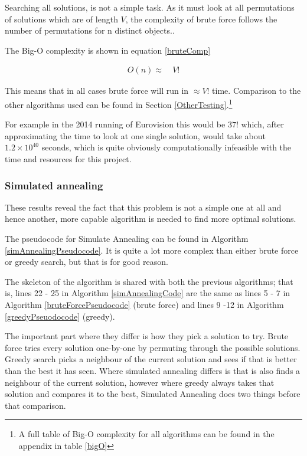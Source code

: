 \documentclass[12pt]{report}
\begin{document}
Searching all solutions, is not a simple task. As it must look at all permutations of solutions which are of length $V$, the complexity of brute force follows the number of permutations for n distinct objects.\cite{Permutation}.

The Big-O complexity is shown in equation \ref{bruteComp}

\begin{equation}\label{bruteComp}
\begin{aligned}
	O(n) \approx{} & \ V!
\end{aligned}
\end{equation}

This means that in all cases brute force will run in $\approx V!$ time. Comparison to the other algorithms used can be found in Section \ref{OtherTesting}.\footnote{A full table of Big-O complexity for all algorithms can be found in the appendix in table \ref{bigO}}

For example in the 2014 running of Eurovision this would be $37!$ which, after approximating the time to look at one single solution, would take about $1.2\times10^{40}$ seconds, which is quite obviously computationally infeasible with the time and resources for this project.

\subsubsection{Simulated annealing}
These results reveal the fact that this problem is not a simple one at all and hence another, more capable algorithm is needed to find more optimal solutions. 

The pseudocode for Simulate Annealing can be found in Algorithm \ref{simAnnealingPseudocode}. It is quite a lot more complex than either brute force or greedy search, but that is for good reason.

The skeleton of the algorithm is shared with both the previous algorithms; that is, lines 22 - 25 in Algorithm \ref{simAnnealingCode} are the same as lines 5 - 7 in Algorithm \ref{bruteForcePseudocode} (brute force) and lines 
9 -12 in Algorithm \ref{greedyPseuodocode} (greedy).

The important part where they differ is how they pick a solution to try. Brute force tries every solution one-by-one by permuting through the possible solutions. Greedy search picks a neighbour of the current solution and sees if that is better than the best it has seen. Where simulated annealing differs is that is also finds a neighbour of the current solution, however where greedy always takes that solution and compares it to the best, Simulated Annealing does two things before that comparison.
\end{document}
